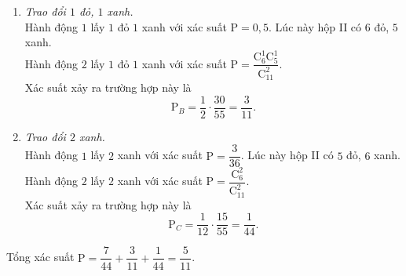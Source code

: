 \begin{ex}
{\begin{itemchoice}
\begin{enumerate}
				Hành động $2$ lấy $2$ đỏ với xác suất $\mathrm{P}=\dfrac{\mathrm{C}_7^2}{\mathrm{C}_{11}^2}$.\\
				Xác suất xảy ra trường hợp này là
				\[\mathrm{P}_{A} = \dfrac{15}{36} \cdot \dfrac{21}{55} = \dfrac{7}{44}.\]
				\item \textit{Trao đổi $1$ đỏ, $1$ xanh.} \\
				Hành động $1$ lấy $1$ đỏ $1$ xanh với xác suất $\mathrm{P}=0{,}5$. Lúc này hộp II có $6$ đỏ, $5$ xanh.\\
				Hành động $2$ lấy $1$ đỏ $1$ xanh với xác suất $\mathrm{P}=\dfrac{\mathrm{C}_6^1\mathrm{C}_5^1}{\mathrm{C}_{11}^2}$.\\
				Xác suất xảy ra trường hợp này là
				\[\mathrm{P}_{B} = \dfrac{1}{2} \cdot \dfrac{30}{55} = \dfrac{3}{11}.\]
				\item \textit{Trao đổi $2$ xanh.}\\
				Hành động $1$ lấy $2$ xanh với xác suất $\mathrm{P}=\dfrac{3}{36}$. Lúc này hộp II có $5$ đỏ, $6$ xanh.\\
				Hành động $2$ lấy $2$ xanh với xác suất $\mathrm{P}=\dfrac{\mathrm{C}_6^2}{\mathrm{C}_{11}^2}$.\\
				Xác suất xảy ra trường hợp này là
				\[\mathrm{P}_{C} = \dfrac{1}{12} \cdot \dfrac{15}{55} = \dfrac{1}{44}.\]
			\end{enumerate}
			Tổng xác suất $\mathrm{P} = \dfrac{7}{44} + \dfrac{3}{11} + \dfrac{1}{44} = \dfrac{5}{11}$.
		\end{itemchoice}
	}
\end{ex}

